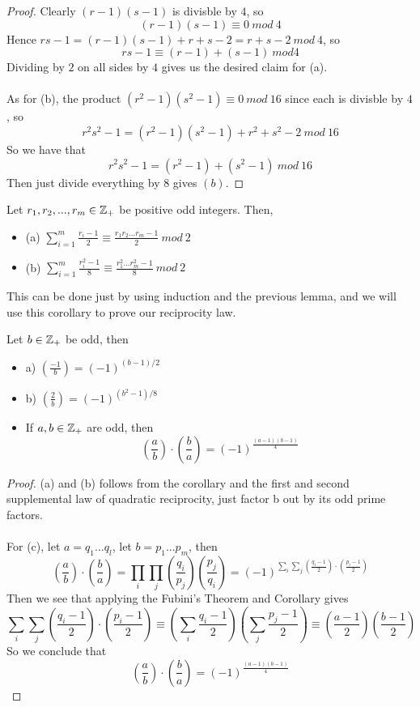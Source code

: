 \begin{proof}
Clearly $(r - 1)(s - 1)$ is divisble by $4$, so
\[(r- 1) (s- 1) \equiv 0\ mod\ 4\]
Hence $rs - 1 = (r - 1)(s - 1) + r + s - 2 = r + s - 2\ mod\ 4$, so
\[rs - 1 \equiv (r - 1) + (s - 1)\ mod 4\]
Dividing by $2$ on all sides by $4$ gives us the desired claim for (a).\\\\
As for (b), the product $(r^2 - 1)(s^2 - 1) \equiv 0\ mod\ 16$ since each is divisble by $4$, so
\[r^2s^2 - 1 = (r^2 - 1)(s^2 - 1) + r^2 + s^2 - 2\ mod\ 16\]
So we have that
\[r^2s^2 - 1 = (r^2 - 1) + (s^2 - 1)\ mod\ 16\]
Then just divide everything by 8 gives $(b)$.
\end{proof}

\begin{corollary}
Let $r_1, r_2, ..., r_m \in \mathbb{Z}_+$ be positive odd integers. Then,
\begin{itemize}
    \item (a) $\sum_{i = 1}^m \frac{r_i - 1}{2} \equiv \frac{r_1r_2...r_m - 1}{2}\ mod\ 2$
    \item (b) $\sum_{i = 1}^m \frac{r_i^2 - 1}{8} \equiv \frac{r_1^2...r_m^2 - 1}{8}\ mod\ 2$
\end{itemize}
This can be done just by using induction and the previous lemma, and we will use this corollary to prove our reciprocity law.
\end{corollary}

\begin{theorem}
Let $b \in \mathbb{Z}_+$ be odd, then
\begin{itemize}
    \item a) $(\frac{-1}{b}) = (-1)^{(b-1)/2}$
    \item b) $(\frac{2}{b}) = (-1)^{(b^2-1)/8}$
    \item If $a, b \in \mathbb{Z}_+$ are odd, then
    \[(\frac{a}{b}) \cdot (\frac{b}{a}) = (-1)^{\frac{(a-1)(b-1)}{4}}\]
\end{itemize}
\end{theorem}

\begin{proof}
(a) and (b) follows from the corollary and the first and second supplemental law of quadratic reciprocity, just factor b out by its odd prime factors.\\\\
For (c), let $a = q_1...q_l$, let $b = p_1...p_m$, then
\[(\frac{a}{b}) \cdot (\frac{b}{a}) = \prod_{i} \prod_j (\frac{q_i}{p_j}) (\frac{p_j}{q_i}) = (-1)^{\sum_i \sum_j (\frac{q_i - 1}{2}) \cdot (\frac{p_i - 1}{2})}\]
Then we see that applying the Fubini's Theorem and Corollary gives
\[\sum_i \sum_j (\frac{q_i - 1}{2}) \cdot (\frac{p_i - 1}{2}) \equiv (\sum_{i} \frac{q_i - 1}{2})(\sum_{j} \frac{p_j - 1}{2}) \equiv (\frac{a - 1}{2})(\frac{b-1}{2}) \]
So we conclude that
    \[(\frac{a}{b}) \cdot (\frac{b}{a}) = (-1)^{\frac{(a-1)(b-1)}{4}}\]
\end{proof}

